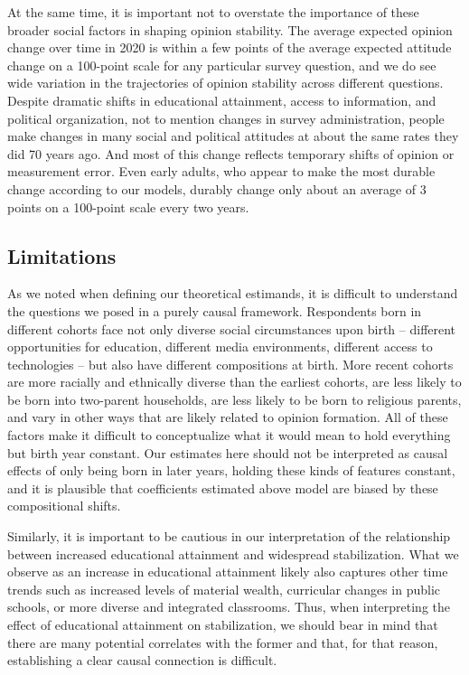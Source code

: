 \documentclass[
  12pt,
]{article}
\begin{document}
At the same time, it is important not to overstate the importance of these broader social factors in shaping opinion stability. The average expected opinion change over time in 2020 is within a few points of the average expected attitude change on a 100-point scale for any particular survey question, and we do see wide variation in the trajectories of opinion stability across different questions. Despite dramatic shifts in educational attainment, access to information, and political organization, not to mention changes in survey administration, people make changes in many social and political attitudes at about the same rates they did 70 years ago. And most of this change reflects temporary shifts of opinion or measurement error. Even early adults, who appear to make the most durable change according to our models, durably change only about an average of 3 points on a 100-point scale every two years.

\hypertarget{limitations}{%
\subsection{Limitations}\label{limitations}}

As we noted when defining our theoretical estimands, it is difficult to understand the questions we posed in a purely causal framework. Respondents born in different cohorts face not only diverse social circumstances upon birth -- different opportunities for education, different media environments, different access to technologies -- but also have different compositions at birth. More recent cohorts are more racially and ethnically diverse than the earliest cohorts, are less likely to be born into two-parent households, are less likely to be born to religious parents, and vary in other ways that are likely related to opinion formation. All of these factors make it difficult to conceptualize what it would mean to hold everything but birth year constant. Our estimates here should not be interpreted as causal effects of only being born in later years, holding these kinds of features constant, and it is plausible that coefficients estimated above model are biased by these compositional shifts.

Similarly, it is important to be cautious in our interpretation of the relationship between increased educational attainment and widespread stabilization. What we observe as an increase in educational attainment likely also captures other time trends such as increased levels of material wealth, curricular changes in public schools, or more diverse and integrated classrooms. Thus, when interpreting the effect of educational attainment on stabilization, we should bear in mind that there are many potential correlates with the former and that, for that reason, establishing a clear causal connection is difficult.
\end{document}
